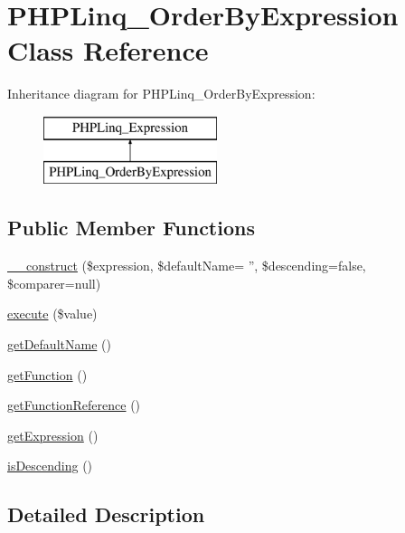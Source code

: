 \hypertarget{class_p_h_p_linq___order_by_expression}{\section{\-P\-H\-P\-Linq\-\_\-\-Order\-By\-Expression \-Class \-Reference}
\label{class_p_h_p_linq___order_by_expression}
}
\-Inheritance diagram for \-P\-H\-P\-Linq\-\_\-\-Order\-By\-Expression\-:\begin{figure}[H]
\begin{center}
\leavevmode
\includegraphics[height=2.000000cm]{class_p_h_p_linq___order_by_expression}
\end{center}
\end{figure}
\subsection*{\-Public \-Member \-Functions}
\begin{DoxyCompactItemize}
\item 
\hyperlink{class_p_h_p_linq___order_by_expression_a99fdd323787851d808d1338a6129fe31}{\-\_\-\-\_\-construct} (\$expression, \$default\-Name= '', \$descending=false, \$comparer=null)
\item 
\hyperlink{class_p_h_p_linq___order_by_expression_aee159037bf6217e4b2f0ab57235dada8}{execute} (\$value)
\item 
\hyperlink{class_p_h_p_linq___order_by_expression_a6b13a94850006d0497889e389eea9885}{get\-Default\-Name} ()
\item 
\hyperlink{class_p_h_p_linq___order_by_expression_a3cb728ca27acfebd282caecdb8a1f5fc}{get\-Function} ()
\item 
\hyperlink{class_p_h_p_linq___order_by_expression_a13bec1b4324ac0cbd5d40826369f5135}{get\-Function\-Reference} ()
\item 
\hyperlink{class_p_h_p_linq___order_by_expression_ab1cefb04a11dacd3164f79373c1294f0}{get\-Expression} ()
\item 
\hyperlink{class_p_h_p_linq___order_by_expression_a8d7e741e6740b5c57292664bffa11293}{is\-Descending} ()
\end{DoxyCompactItemize}


\subsection{\-Detailed \-Description}


